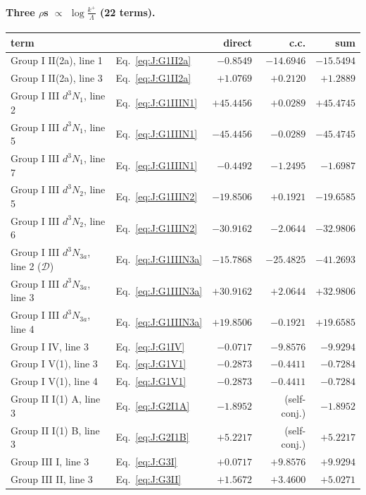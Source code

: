 \documentclass[10pt]{article}
\numberwithin{equation}{section}
\begin{document}
\paragraph{Three $\rho$\textquotesingle s $\propto$ $\log\frac{k^+}{\Lambda}$ (22 terms).}
\begin{longtable}{@{}llrrr@{}}\toprule
term & & direct & c.c. & sum\\\midrule
Group I II(2a), line 1 & Eq.~\eqref{eq:J:G1II2a} & $-0.8549$ & $-14.6946$ & $-15.5494$\\
Group I II(2a), line 3 & Eq.~\eqref{eq:J:G1II2a} & $+1.0769$ & $+0.2120$ & $+1.2889$\\
Group I III $d^3N_1$, line 2 & Eq.~\eqref{eq:J:G1IIIN1} & $+45.4456$ & $+0.0289$ & $+45.4745$\\
Group I III $d^3N_1$, line 5 & Eq.~\eqref{eq:J:G1IIIN1} & $-45.4456$ & $-0.0289$ & $-45.4745$\\
Group I III $d^3N_1$, line 7 & Eq.~\eqref{eq:J:G1IIIN1} & $-0.4492$ & $-1.2495$ & $-1.6987$\\
Group I III $d^3N_2$, line 5 & Eq.~\eqref{eq:J:G1IIIN2} & $-19.8506$ & $+0.1921$ & $-19.6585$\\
Group I III $d^3N_2$, line 6 & Eq.~\eqref{eq:J:G1IIIN2} & $-30.9162$ & $-2.0644$ & $-32.9806$\\
Group I III $d^3N_{3a}$, line 2 ($\mathcal D$) & Eq.~\eqref{eq:J:G1IIIN3a} & $-15.7868$ & $-25.4825$ & $-41.2693$\\
Group I III $d^3N_{3a}$, line 3 & Eq.~\eqref{eq:J:G1IIIN3a} & $+30.9162$ & $+2.0644$ & $+32.9806$\\
Group I III $d^3N_{3a}$, line 4 & Eq.~\eqref{eq:J:G1IIIN3a} & $+19.8506$ & $-0.1921$ & $+19.6585$\\
Group I IV, line 3 & Eq.~\eqref{eq:J:G1IV} & $-0.0717$ & $-9.8576$ & $-9.9294$\\
Group I V(1), line 3 & Eq.~\eqref{eq:J:G1V1} & $-0.2873$ & $-0.4411$ & $-0.7284$\\
Group I V(1), line 4 & Eq.~\eqref{eq:J:G1V1} & $-0.2873$ & $-0.4411$ & $-0.7284$\\
Group II I(1) A, line 3 & Eq.~\eqref{eq:J:G2I1A} & $-1.8952$ & (self-conj.) & $-1.8952$\\
Group II I(1) B, line 3 & Eq.~\eqref{eq:J:G2I1B} & $+5.2217$ & (self-conj.) & $+5.2217$\\
Group III I, line 3 & Eq.~\eqref{eq:J:G3I} & $+0.0717$ & $+9.8576$ & $+9.9294$\\
Group III II, line 3 & Eq.~\eqref{eq:J:G3II} & $+1.5672$ & $+3.4600$ & $+5.0271$\\

\end{longtable}
\end{document}
